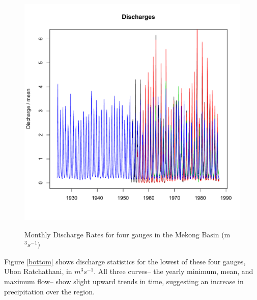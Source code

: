 \documentclass[11pt,english]{article}
\theoremstyle{plain} \newtheorem{claim}{Claim}
\theoremstyle{plain} \newtheorem{prop}{Proposition}
\theoremstyle{plain} \newtheorem{hypo}{Hypothesis}
\begin{document}
\begin{figure}
\includegraphics{displays/discharge_time.pdf}
\label{discharge}
\caption{Monthly Discharge Rates for four gauges in the Mekong Basin (m$^3 s^{-1})$} 
\end{figure}
 
Figure \ref{bottom} shows discharge statistics for the lowest of these four gauges, Ubon Ratchathani, in $m^3 s^{-1}$. %
All three curves-- the yearly minimum, mean, and maximum flow-- show slight upward trends in time, suggesting an increase in precipitation over the region.
 
\end{document}
